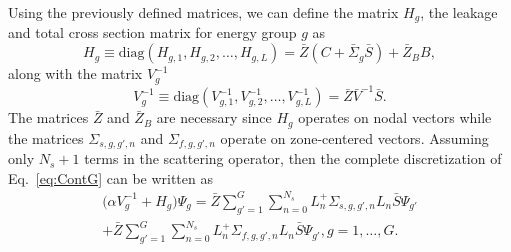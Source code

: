 Using the previously defined matrices, we can define the matrix $H_{g}$, the leakage and total cross section matrix for energy group $g$ as
\begin{equation}
	H_{g} \equiv \text{diag}(H_{g,1}, H_{g,2}, \dots, H_{g,L}) = \bar{Z}(C + \bar{\Sigma}_{g} \bar{S}) + \bar{Z}_{B}B,
\end{equation}
along with the matrix $V^{-1}_{g}$
\begin{equation}
	V^{-1}_{g} \equiv \text{diag}(V^{-1}_{g,1}, V^{-1}_{g,2}, \dots, V^{-1}_{g,L}) = \bar{Z} \bar{V}^{-1} \bar{S}.
\end{equation}
The matrices $\bar{Z}$ and $\bar{Z}_{B}$ are necessary since $H_{g}$ operates on nodal vectors while the matrices $\Sigma_{s,g,g',n}$ and $\Sigma_{f,g,g',n}$ operate on zone-centered vectors. Assuming only $N_{s} + 1$ terms in the scattering operator, then the complete discretization of Eq.~\ref{eq:ContG} can be written as
\begin{multline}
\big ( \alpha V^{-1}_{g} + H_{g} \big ) \Psi_{g} = \bar{Z} \sum_{g'=1}^{G} \sum_{n=0}^{N_{s}} L_{n}^{+} \Sigma_{s,g,g',n} L_{n} \bar{S} \Psi_{g'} \\ + \bar{Z}\sum_{g'=1}^{G} \sum_{n=0}^{N_{s}} L_{n}^{+} \Sigma_{f,g,g',n} L_{n} \bar{S} \Psi_{g'}, g = 1, \dots, G.
\end{multline}


